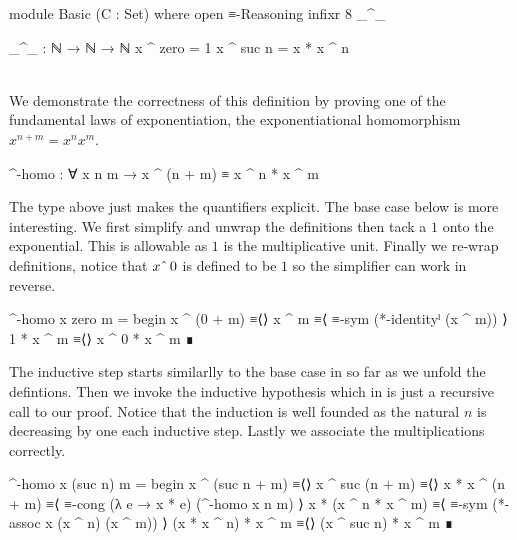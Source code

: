 \documentclass[./Thesis.tex]{subfiles}
\begin{document}
\begin{code}[hide]
  module Basic (C : Set) where
    open ≡-Reasoning 
    infixr 8 _^_
\end{code}
\begin{code}
    _^_ : ℕ → ℕ → ℕ
    x ^ zero = 1
    x ^ suc n = x * x ^ n
\end{code} \\

We demonstrate the correctness of this definition by proving one of the
fundamental laws of exponentiation,
the exponentiational homomorphism $x^{n + m} = x^n x^m$.
\begin{code}
    ^-homo : ∀ x n m → x ^ (n + m) ≡ x ^ n * x ^ m
\end{code}
The type above just makes the quantifiers explicit. The base case below
is more interesting. We first simplify and unwrap the definitions then
tack a $1$ onto the exponential. This is allowable as $1$ is the
multiplicative unit. Finally we re-wrap definitions, notice that
$x \string^{} \, 0$ is defined to be $1$ so the simplifier can work in reverse.
\begin{code}
    ^-homo x zero m = begin
      x ^ (0 + m)   ≡⟨⟩
      x ^ m         ≡⟨ ≡-sym (*-identityˡ (x ^ m)) ⟩
      1 * x ^ m     ≡⟨⟩
      x ^ 0 * x ^ m ∎
\end{code}
The inductive step starts similarlly to the base case in so far as we
unfold the defintions. Then we invoke the inductive hypothesis which in \Agda{}
is just a recursive call to our proof. Notice that the induction is well founded
as the natural $n$ is decreasing by one each inductive step.
Lastly we associate the multiplications correctly.
\begin{code}
    ^-homo x (suc n) m = begin
      x ^ (suc n + m)     ≡⟨⟩
      x ^ suc (n + m)     ≡⟨⟩
      x * x ^ (n + m)     ≡⟨ ≡-cong (λ e → x * e) (^-homo x n m) ⟩
      x * (x ^ n * x ^ m) ≡⟨ ≡-sym (*-assoc x (x ^ n) (x ^ m)) ⟩
      (x * x ^ n) * x ^ m ≡⟨⟩
      (x ^ suc n) * x ^ m ∎
\end{code}
\end{document}
